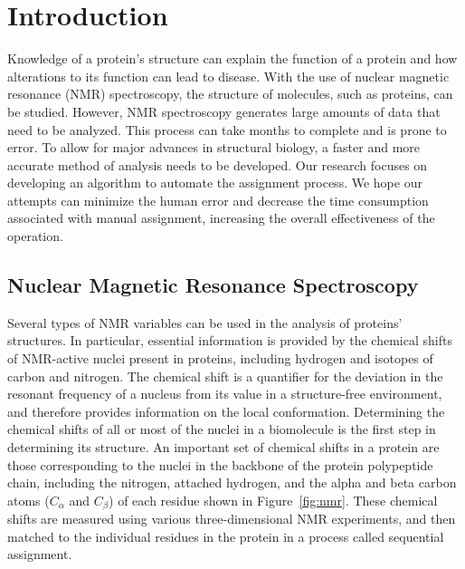 \documentclass[12pt, letter]{article}
\begin{document}
\section{Introduction}
\label{sub:introduction}
Knowledge of a protein's structure can explain the function of a protein and how alterations to its function can lead to disease. With the use of nuclear magnetic resonance (NMR) spectroscopy, the structure of molecules, such as proteins, can be studied. However, NMR spectroscopy generates large amounts of data that need to be analyzed. This process can take months to complete and is prone to error. To allow for major advances in structural biology, a faster and more accurate method of analysis needs to be developed. Our research focuses on developing an algorithm to automate the assignment process. We hope our attempts can minimize the human error and decrease the time consumption associated with manual assignment, increasing the overall effectiveness of the operation.

\subsection{Nuclear Magnetic Resonance Spectroscopy} %
\label{sub:nmr}
Several types of NMR variables can be used in the analysis of proteins' structures. In particular, essential information is provided by the chemical shifts of NMR-active nuclei present in proteins, including hydrogen and isotopes of carbon and nitrogen. The chemical shift is a quantifier for the deviation in the resonant frequency of a nucleus from its value in a structure-free environment, and therefore provides information on the local conformation. Determining the chemical shifts of all or most of the nuclei in a biomolecule is the first step in determining its structure. An important set of chemical shifts in a protein are those corresponding to the nuclei in the backbone of the protein polypeptide chain, including the nitrogen, attached hydrogen, and the alpha and beta carbon atoms ($C_\alpha$ and $C_{\beta}$) of each residue shown in Figure~\ref{fig:nmr}. These chemical shifts are measured using various three-dimensional NMR experiments, and then matched to the individual residues in the protein in a process called sequential assignment.
\end{document}
